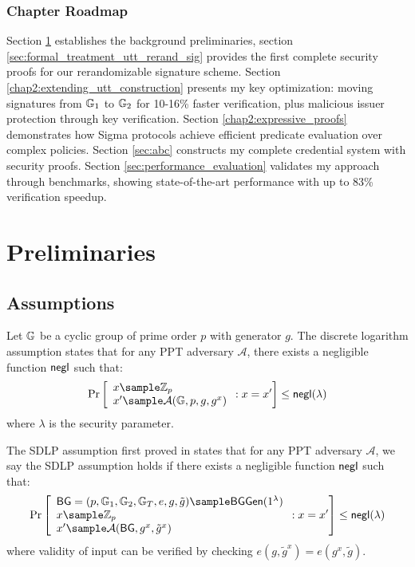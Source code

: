 \subsubsection*{Chapter Roadmap}
Section \ref{chap2:preliminaries} establishes the background preliminaries, section \ref{sec:formal_treatment_utt_rerand_sig} provides the first complete security proofs for our rerandomizable signature scheme. Section \ref{chap2:extending_utt_construction} presents my key optimization: moving signatures from $\mathbb{G}_1$ to $\mathbb{G}_2$ for 10-16\% faster verification, plus malicious issuer protection through key verification. Section \ref{chap2:expressive_proofs} demonstrates how Sigma protocols achieve efficient predicate evaluation over complex policies. Section \ref{sec:abc} constructs my complete credential system with security proofs. Section \ref{sec:performance_evaluation} validates my approach through benchmarks, showing state-of-the-art performance with up to 83\% verification speedup.






\section{Preliminaries}\label{chap2:preliminaries}

\subsection{Assumptions}

\begin{definition}\label{dlp}
Let $\mathbb{G}$ be a cyclic group of prime order $p$ with generator $g$. The discrete logarithm assumption \cite{DBLP:journals/tit/DiffieH76} states that for any PPT adversary $\mathcal{A}$, there exists a negligible function $\mathsf{negl}$ such that:
$$\Pr\left[\begin{array}{l}
    x \sample \Z_p \\
    x' \sample \mathcal{A}(\G, p, g, g^x)
\end{array} : x = x'\right] \leq \negl(\lambda)$$
where $\lambda$ is the security parameter.
\end{definition}


\begin{definition}\label{sdlp}
The SDLP assumption first proved in \cite{hutchison_get_2010} states that for any PPT adversary $\mathcal{A}$, we say the SDLP assumption holds if there exists a negligible function $\mathsf{negl}$ such that:
$$\Pr\left[\begin{array}{l}
    \BG = (p, \G_1, \G_2, \G_T, e, g, \tilde{g}) \sample \BGGen(1^\lambda) \\
    x \sample \Z_p \\
    x' \sample \mathcal{A}(\BG, g^x, \tilde{g}^x)
\end{array} : x = x'\right] \leq \negl(\lambda)$$
where validity of input can be verified by checking $e(g, \tilde{g}^x) = e(g^x, \tilde{g})$.
\end{definition} 


